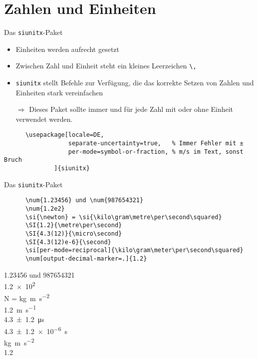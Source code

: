 \section{Zahlen und Einheiten}

\begin{frame}[fragile]{
  Das \texttt{siunitx}-Paket
  \hfill{}
}
\begin{itemize}
    \item Einheiten werden aufrecht gesetzt
    \item Zwischen Zahl und Einheit steht ein kleines Leerzeichen \verb+\,+
    \item \texttt{siunitx} stellt Befehle zur Verfügung, die das korrekte Setzen von Zahlen und Einheiten stark vereinfachen
    \item[$\Rightarrow$] Dieses Paket sollte immer und für jede Zahl mit oder ohne Einheit verwendet werden.
\end{itemize}
  \begin{Packages}
    \begin{lstlisting}
      \usepackage[locale=DE,
                  separate-uncertainty=true,   % Immer Fehler mit ±
                  per-mode=symbol-or-fraction, % m/s im Text, sonst Bruch
              ]{siunitx}
    \end{lstlisting}
  \end{Packages}
\end{frame}

\begin{frame}[fragile]{Das \texttt{siunitx}-Paket}
  \begin{CodeExample}{0.60}
    \begin{lstlisting}
      \num{1.23456} und \num{987654321}
      \num{1.2e2}
      \si{\newton} = \si{\kilo\gram\metre\per\second\squared}
      \SI{1.2}{\metre\per\second}
      \SI{4.3(12)}{\micro\second}
      \SI{4.3(12)e-6}{\second}
      \si[per-mode=reciprocal]{\kilo\gram\meter\per\second\squared}
      \num[output-decimal-marker=.]{1.2}
    \end{lstlisting}
  \CodeResult
    \num{1.23456} und \num{987654321} \\
    \num{1.2e2} \\
    \smallbreak
    \si{\newton} = \si{\kilo\gram\metre\per\second\squared} \\
    \medbreak
    \SI{1.2}{\metre\per\second} \\
    \SI{4.3(12)}{\micro\second} \\
    \SI{4.3(12)e-6}{\second} \\
    \si[per-mode=reciprocal]{\kilo\gram\meter\per\second\squared} \\[\baselineskip]
    \num[output-decimal-marker=.]{1.2}
  \end{CodeExample}
\end{frame}
